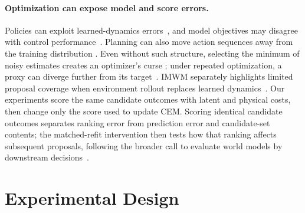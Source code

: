 \documentclass[10pt]{article}
\begin{document}
\paragraph{Optimization can expose model and score errors.}
Policies can exploit learned-dynamics errors~\citep{janner2019trust}, and model
objectives may disagree with control performance~\citep{lambert2020objective}.
Planning can also move action sequences away from the training distribution
\citep{parthasarathy2025traintest}. Even without such structure, selecting the
minimum of noisy estimates creates an optimizer's curse
\citep{smith2006optimizer}; under repeated optimization, a proxy can diverge
further from its target~\citep{gao2023overopt,skalse2022defining,
karwowski2024goodhart}. IMWM separately highlights limited proposal coverage
when environment rollout replaces learned dynamics~\citep{imwm2026}. Our
experiments score the same candidate outcomes with latent and physical costs,
then change only the score used to update CEM. Scoring identical candidate
outcomes separates ranking error from prediction error and candidate-set
contents; the matched-refit intervention then tests how that ranking affects
subsequent proposals, following the broader call to evaluate world models by
downstream decisions~\citep{yu2026wmeval}.

\section{Experimental Design}\label{sec:design}
\end{document}
